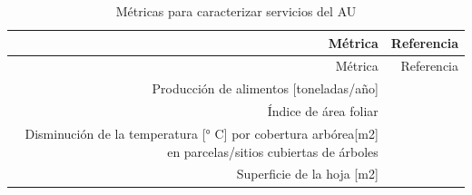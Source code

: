 \documentclass[12pt,]{book}
\begin{document}
\begin{longtable}[]{@{}rr@{}}
\caption{\label{tab:ind-AU} Métricas para caracterizar servicios del
AU}\tabularnewline
\toprule
\begin{minipage}[b]{0.57\columnwidth}\raggedleft\strut
Métrica\strut
\end{minipage} & \begin{minipage}[b]{0.31\columnwidth}\raggedleft\strut
Referencia\strut
\end{minipage}\tabularnewline
\midrule
\endfirsthead
\toprule
\begin{minipage}[b]{0.57\columnwidth}\raggedleft\strut
Métrica\strut
\end{minipage} & \begin{minipage}[b]{0.31\columnwidth}\raggedleft\strut
Referencia\strut
\end{minipage}\tabularnewline
\midrule
\endhead
\begin{minipage}[t]{0.57\columnwidth}\raggedleft\strut
Producción de alimentos {[}toneladas/año{]}\strut
\end{minipage} & \begin{minipage}[t]{0.31\columnwidth}\raggedleft\strut
\citep{gomez-baggethun_classifying_2013}\strut
\end{minipage}\tabularnewline
\begin{minipage}[t]{0.57\columnwidth}\raggedleft\strut
Índice de área foliar\strut
\end{minipage} & \begin{minipage}[t]{0.31\columnwidth}\raggedleft\strut
\citep{gomez-baggethun_classifying_2013}\strut
\end{minipage}\tabularnewline
\begin{minipage}[t]{0.57\columnwidth}\raggedleft\strut
Disminución de la temperatura {[}° C{]} por cobertura arbórea{[}m2{]} en
parcelas/sitios cubiertas de árboles\strut
\end{minipage} & \begin{minipage}[t]{0.31\columnwidth}\raggedleft\strut
\citep{gomez-baggethun_classifying_2013}\strut
\end{minipage}\tabularnewline
\begin{minipage}[t]{0.57\columnwidth}\raggedleft\strut
Superficie de la hoja {[}m2{]}\strut
\end{minipage} & \begin{minipage}[t]{0.31\columnwidth}\raggedleft\strut
\citep{gomez-baggethun_classifying_2013}\strut
\end{minipage}\tabularnewline

\end{longtable}
\end{document}
